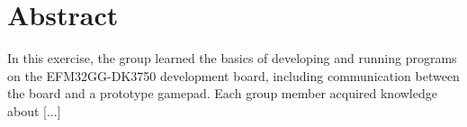 \chapter{Abstract}
In this exercise, the group learned the basics of developing and running programs on the EFM32GG-DK3750 development board, including communication between the board and a prototype gamepad. Each group member acquired knowledge about [...]